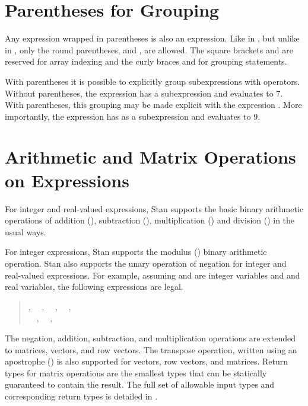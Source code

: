 \section{Parentheses for Grouping}

Any expression wrapped in parentheses is also an expression. Like in
\Cpp, but unlike in \R, only the round parentheses, \code{(} and
\code{)}, are allowed.  The square brackets \code{[} and \code{]} are
reserved for array indexing and the curly braces \code{\{} and
\code{\}} for grouping statements.

With parentheses it is possible to explicitly group subexpressions
with operators.  Without parentheses, the expression 
has a subexpression  and evaluates to 7.  With
parentheses, this grouping may be made explicit with the expression
.  More importantly, the expression  has  as a subexpression and evaluates to 9.


\section{Arithmetic and Matrix Operations on Expressions}\label{arithmetic-expressions.section}

For integer and real-valued expressions, Stan supports the basic
binary arithmetic operations of addition (\code{+}), subtraction
(\code{-}), multiplication (\code{*}) and division (\code{/}) in the
usual ways.

For integer expressions, Stan supports the modulus (\code{\%}) binary
arithmetic operation.  Stan also supports the unary operation of
negation for integer and real-valued expressions.  For example,
assuming  and  are integer variables and  and
 real variables, the following expressions are legal.
%
\begin{quote}
,
\ \ ,
\ \ ,
\ \ ,
\\
\ \ ,
\ \ ,
\ \ 
\end{quote}
%
The negation, addition, subtraction, and multiplication operations are
extended to matrices, vectors, and row vectors.  The transpose
operation, written using an apostrophe () is also supported
for vectors, row vectors, and matrices.  Return types for matrix
operations are the smallest types that can be statically guaranteed to
contain the result.  The full set of allowable input types and
corresponding return types is detailed in
.

